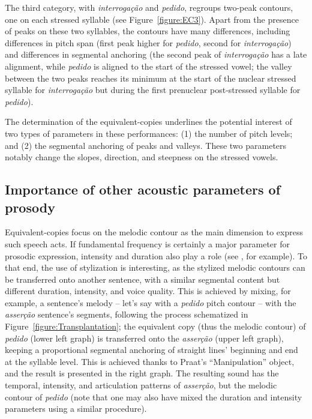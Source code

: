 \documentclass[output=paper]{LSP/langsci}
\begin{document}
The third category, with \textit{interrogação} and \textit{pedido}, regroups two-peak contours, one on each stressed syllable (see Figure~\ref{figure:EC3}). 
Apart from the presence of peaks on these two syllables, the contours have many differences, including differences in pitch span (first peak higher for \textit{pedido}, second for \textit{interrogação}) and differences in segmental anchoring (the second peak of \textit{interrogação} has a late alignment, while \textit{pedido} is aligned to the start of the stressed vowel; the valley between the two peaks reaches its minimum at the start of the nuclear stressed syllable for \textit{interrogação} but during the first prenuclear post-stressed syllable for \textit{pedido}).

The determination of the equivalent-copies underlines the potential interest of two types of parameters in these performances: 
(1) the number of pitch levels; 
and (2) the segmental anchoring of peaks and valleys.
These two parameters notably change the slopes, direction, and steepness on the stressed vowels.

\subsection{Importance of other acoustic parameters of prosody}
\label{corpus:importance}

Equivalent-copies focus on the melodic contour as the main dimension to express such speech acts. 
If fundamental frequency is certainly a major parameter for prosodic expression, intensity and duration also play a role (see \citealt{kochanski2005loudness}, for example). 
To that end, the use of stylization is interesting, as the stylized melodic contours can be transferred onto another sentence, with a similar segmental content but different duration, intensity, and voice quality. 
This is achieved by mixing, for example, a sentence's melody -- let's say with a \textit{pedido} pitch contour -- with the \textit{asserção} sentence's segments, following the process schematized in Figure~\ref{figure:Transplantation}; the equivalent copy (thus the melodic contour) of \textit{pedido} (lower left graph) is transferred onto the \textit{asserção} (upper left graph), keeping a proportional segmental anchoring of straight lines' beginning and end at the syllable level. 
This is achieved thanks to Praat's ``Manipulation'' object, and the result is presented in the right graph. 
The resulting sound has the temporal, intensity, and articulation patterns of \textit{asserção}, but the melodic contour of \textit{pedido} (note that one may also have mixed the duration and intensity parameters using a similar procedure).
\end{document}
